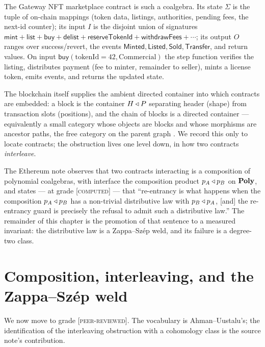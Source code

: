 \begin{example}
\label{ex:blk-gateway}
The Gateway NFT marketplace contract is such a coalgebra. Its state $\Sigma$ is the tuple
of on-chain mappings (token data, listings, authorities, pending fees, the next-id
counter); its input $I$ is the disjoint union of signatures
$\mathsf{mint}+\mathsf{list}+\mathsf{buy}+\mathsf{delist}+\mathsf{reserveTokenId}+
\mathsf{withdrawFees}+\cdots$; its output $O$ ranges over success/revert, the events
$\mathsf{Minted},\mathsf{Listed},\mathsf{Sold},\mathsf{Transfer}$, and return values. On
input $\mathsf{buy}(\mathrm{tokenId}{=}42,\mathrm{Commercial})$ the step function verifies
the listing, distributes payment (fee to minter, remainder to seller), mints a license
token, emits events, and returns the updated state.
\end{example}

The blockchain itself supplies the ambient directed container into which contracts are
embedded: a block is the container $H\triangleleft P$ separating header (shape) from transaction
slots (positions), and the chain of blocks is a directed container --- equivalently a
small category whose objects are blocks and whose morphisms are ancestor paths, the
free category on the parent graph \cite{AU16}. We record this only to locate contracts;
the obstruction lives one level down, in how two contracts \emph{interleave}.

\begin{remark}
The Ethereum note observes that two contracts interacting is a composition of
polynomial coalgebras, with interface the composition product $p_A\triangleleft p_B$ on $\mathbf{Poly}$,
and states --- at grade \textsc{[computed]} --- that ``re-entrancy is what happens when
the composition $p_A\triangleleft p_B$ has a non-trivial distributive law with $p_B\triangleleft p_A$,
[and] the re-entrancy guard is precisely the refusal to admit such a distributive law.''
The remainder of this chapter is the promotion of that sentence to a measured invariant:
the distributive law is a Zappa--Sz\'ep weld, and its failure is a degree-two class.
\end{remark}

\section{Composition, interleaving, and the Zappa--Sz\'ep weld}
\label{sec:blk-zs}

We now move to grade \textsc{[peer-reviewed]}. The vocabulary is Ahman--Uustalu's; the
identification of the interleaving obstruction with a cohomology class is the source
note's contribution.

